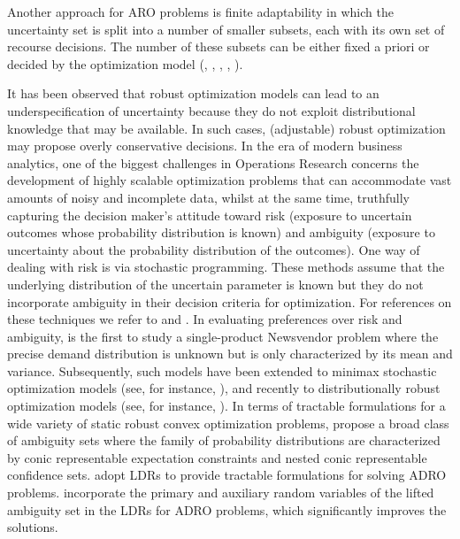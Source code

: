 \documentclass[fleqn,mnsc,blindrev]{informs4}
\begin{document}
	Another approach for ARO problems is finite adaptability in which the uncertainty set is split into a number of smaller subsets, each with its own set of recourse decisions. The number of these subsets can be either fixed a priori or decided by the optimization model (\cite{vkr11}, \cite{bc10}, \cite{hkw14}, \cite{pd16}, \cite{bd16a}).
	
	It has been observed that robust optimization models can lead to an underspecification of uncertainty because they do not exploit distributional knowledge that may be available. In such cases, (adjustable) robust optimization may propose overly conservative decisions. In the era of modern business analytics, one of the biggest challenges in Operations Research concerns the development of highly scalable optimization problems that can accommodate vast amounts of noisy and incomplete data, whilst at the same time, truthfully capturing the decision maker's attitude toward risk (exposure to uncertain outcomes whose probability distribution is known) and ambiguity (exposure to uncertainty about the probability distribution of the outcomes). One way of dealing with risk is via stochastic programming. These methods assume that the underlying distribution of the uncertain parameter is known but they do not incorporate ambiguity in their decision criteria for optimization. For references on these techniques we refer to \cite{bl97} and \cite{kw95}. In evaluating preferences over risk and ambiguity, \cite{scarf58} is the first to study a single-product Newsvendor problem where the precise demand distribution is unknown but is only characterized by its mean and variance. Subsequently, such models have been extended to minimax stochastic optimization models (see, for instance, \cite{z66,be95,sk02,sa04}), and recently to distributionally robust optimization models (see, for instance, \cite{css07,cs09,p07,dy10,xm12}). In terms of tractable formulations for a wide variety of static robust convex optimization problems, \cite{wks14} propose a broad class of ambiguity  {sets} where the family of probability distributions are characterized by conic representable expectation constraints and nested conic representable confidence sets. \cite{css07} adopt LDRs to provide tractable formulations for solving ADRO problems. \cite{bsz17} incorporate the primary and auxiliary random variables of the lifted ambiguity set in the LDRs for ADRO problems, which significantly improves the solutions.
	
\end{document}
